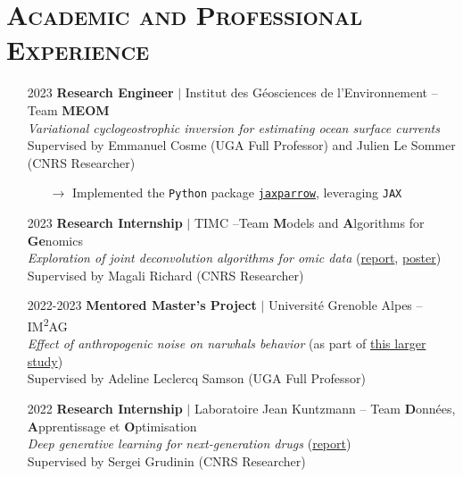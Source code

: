 \documentclass{article}
\begin{document}
\section*{\textsc{Academic and Professional Experience}}
\begin{itemize}
    \item[] 2023 \tabto{2cm} \textbf{Research Engineer} $\vert$ Institut des Géosciences de l'Environnement – Team \textbf{MEOM} \\[.1 cm]
    \tabto{2cm} \textit{Variational cyclogeostrophic inversion for estimating ocean surface currents} \\[.1 cm]
    \tabto{2cm} Supervised by Emmanuel Cosme (UGA Full Professor) and Julien Le Sommer (CNRS Researcher)
    \vspace{-.1 cm}
    \begin{itemize}[left=2cm]
        \item[$\rightarrow$] Implemented the \texttt{Python} package \href{https://github.com/meom-group/jaxparrow}{\texttt{jaxparrow}}, leveraging \texttt{JAX}
    \end{itemize}
    
    \item[] 2023 \tabto{2cm} \textbf{Research Internship} $\vert$ TIMC –Team \textbf{M}odels and \textbf{A}lgorithms for \textbf{Ge}nomics \\[.1 cm]
    \tabto{2cm} \textit{Exploration of joint deconvolution algorithms for omic data} (\href{https://vadmbertr.github.io/Exploration-of-joint-deconvolution-algorithms-for-omic-data/M2_Internship_report__Exploration_of_joint_deconvolution_algorithms_for_omic_data.pdf}{report}, \href{https://vadmbertr.github.io/Exploration-of-joint-deconvolution-algorithms-for-omic-data/poster_jobim_ismb.pdf}{poster}) \\[.1 cm]
    \tabto{2cm} Supervised by Magali Richard (CNRS Researcher)
    
    \item[] 2022-2023 \tabto{2cm} \textbf{Mentored Master's Project} $\vert$ Université Grenoble Alpes – IM\textsuperscript{2}AG \\[.1 cm]
    \tabto{2cm} \textit{Effect of anthropogenic noise on narwhals behavior} (as part of \href{https://doi.org/10.1126/sciadv.ade0440}{this larger study}) \\[.1 cm]
    \tabto{2cm} Supervised by Adeline Leclercq Samson (UGA Full Professor)
    
    \item[] 2022 \tabto{2cm} \textbf{Research Internship} $\vert$ Laboratoire Jean Kuntzmann – Team \textbf{D}onnées, \textbf{A}pprentissage et \textbf{O}ptimisation \\[.1 cm]
    \tabto{2cm} \textit{Deep generative learning for next-generation drugs} (\href{https://vadmbertr.github.io/Deep-generative-learning-for-next-generation-drugs/Internship_report___Deep_generative_learning_for_next_generation_drugs.pdf}{report}) \\[.1 cm]
    \tabto{2cm} Supervised by Sergei Grudinin (CNRS Researcher)
    

\end{itemize}
\end{document}
